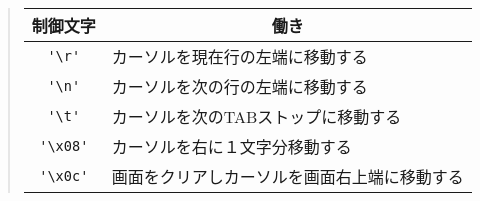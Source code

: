 \begin{quote}
\begin{tabular}{c|l}
\multicolumn{1}{c|}{制御文字} & \multicolumn{1}{c}{働き} \\\hline
\verb/'\r'/ & カーソルを現在行の左端に移動する \\
\verb/'\n'/ & カーソルを次の行の左端に移動する \\
\verb/'\t'/ & カーソルを次のTABストップに移動する \\
\verb/'\x08'/ & カーソルを右に１文字分移動する \\
\verb/'\x0c'/ & 画面をクリアしカーソルを画面右上端に移動する \\
\end{tabular}
\end{quote}

